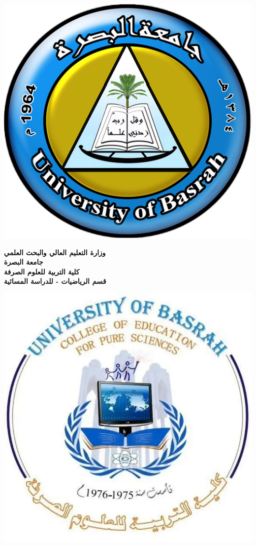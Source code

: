 \begin{titlepage}
	\begin{minipage}{0.2\textwidth}
		\raggedleft\includegraphics[scale=0.2]{Title Page/university.png}
	\end{minipage}
	\hfill
	\begin{minipage}{0.5\textwidth}
		\centering
		\textbf{وزارة التعليم العالي والبحث العلمي}\\
		\textbf{جامعة البصرة}\\
		\textbf{كلية التربية للعلوم الصرفة}\\
		\textbf{قسم الرياضيات - للدراسة المسائية}
	\end{minipage}
	\hfill
	\begin{minipage}{0.2\textwidth}
		\raggedright\includegraphics[scale=0.16]{Title Page/college.png}   
	\end{minipage}
	

\end{titlepage}

